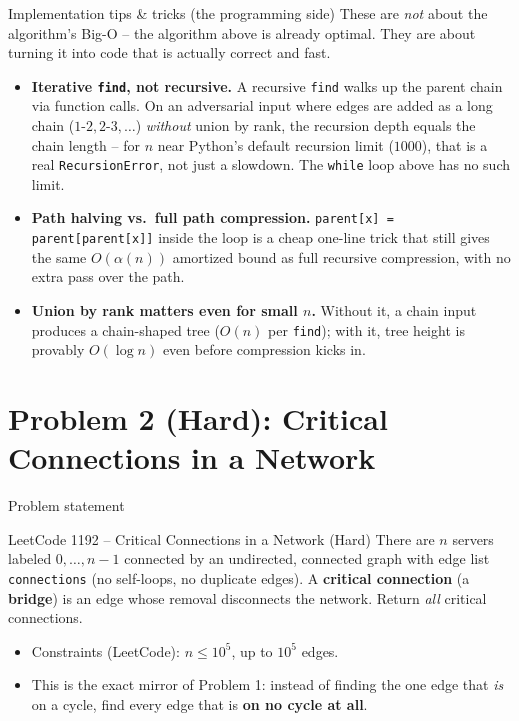 \documentclass[11pt,aspectratio=169]{beamer}
\begin{document}
\begin{frame}{Implementation tips \& tricks (the programming side)}
  \small
  These are \emph{not} about the algorithm's Big-O -- the algorithm above is already
  optimal. They are about turning it into code that is actually correct and fast.
  \begin{itemize}
    \item \textbf{Iterative \texttt{find}, not recursive.} A recursive \texttt{find}
    walks up the parent chain via function calls. On an adversarial input where edges
    are added as a long chain ($1\text{-}2, 2\text{-}3, \dots$) \emph{without} union by
    rank, the recursion depth equals the chain length -- for $n$ near Python's default
    recursion limit ($1000$), that is a real \texttt{RecursionError}, not just a
    slowdown. The \texttt{while} loop above has no such limit.
    \item \textbf{Path halving vs.\ full path compression.} \texttt{parent[x] =
    parent[parent[x]]} inside the loop is a cheap one-line trick that still gives the
    same $O(\alpha(n))$ amortized bound as full recursive compression, with no extra
    pass over the path.
    \item \textbf{Union by rank matters even for small $n$.} Without it, a chain input
    produces a chain-shaped tree ($O(n)$ per \texttt{find}); with it, tree height is
    provably $O(\log n)$ even before compression kicks in.
  \end{itemize}
\end{frame}

\section{Problem 2 (Hard): Critical Connections in a Network}

\begin{frame}{Problem statement}
  \begin{block}{LeetCode 1192 -- Critical Connections in a Network (\textcolor{red!60!black}{Hard})}
    There are $n$ servers labeled $0,\dots,n-1$ connected by an undirected, connected
    graph with edge list \texttt{connections} (no self-loops, no duplicate edges).
    A \textbf{critical connection} (a \textbf{bridge}) is an edge whose removal
    disconnects the network. Return \emph{all} critical connections.
  \end{block}
  \begin{itemize}
    \item Constraints (LeetCode): $n \le 10^5$, up to $10^5$ edges.
    \item This is the exact mirror of Problem 1: instead of finding the one edge that
    \emph{is} on a cycle, find every edge that is \textbf{on no cycle at all}.
  \end{itemize}
\end{frame}
\end{document}
